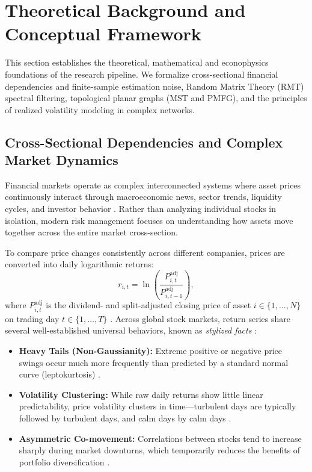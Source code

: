 \section{Theoretical Background and Conceptual Framework}
\label{sec:theoretical_background}

This section establishes the theoretical, mathematical and econophysics foundations of the research pipeline. We formalize cross-sectional financial dependencies and finite-sample estimation noise, Random Matrix Theory (RMT) spectral filtering, topological planar graphs (MST and PMFG), and the principles of realized volatility modeling in complex networks.

\subsection{Cross-Sectional Dependencies and Complex Market Dynamics}
\label{subsec:theory_market_dynamics}

Financial markets operate as complex interconnected systems where asset prices continuously interact through macroeconomic news, sector trends, liquidity cycles, and investor behavior \cite{mantegna_stanley_1999_book,bouchaud_potters_2003}. Rather than analyzing individual stocks in isolation, modern risk management focuses on understanding how assets move together across the entire market cross-section.

To compare price changes consistently across different companies, prices are converted into daily logarithmic returns:
\begin{equation}
r_{i,t} = \ln\left(\frac{P_{i,t}^{\mathrm{adj}}}{P_{i,t-1}^{\mathrm{adj}}}\right),
\label{eq:theory_log_returns}
\end{equation}
where $P_{i,t}^{\mathrm{adj}}$ is the dividend- and split-adjusted closing price of asset $i \in \{1, \dots, N\}$ on trading day $t \in \{1, \dots, T\}$ \cite{campbell_1997_econometrics,tsay_2005_analysis}. Across global stock markets, return series share several well-established universal behaviors, known as \emph{stylized facts} \cite{cont_2001_empirical}:
\begin{itemize}
  \item \textbf{Heavy Tails (Non-Gaussianity):} Extreme positive or negative price swings occur much more frequently than predicted by a standard normal curve (leptokurtosis) \cite{mandelbrot_1963_variation,fama_1965_behavior}.
  \item \textbf{Volatility Clustering:} While raw daily returns show little linear predictability, price volatility clusters in time---turbulent days are typically followed by turbulent days, and calm days by calm days \cite{engle_1982_autoregressive,bollerslev_1986_generalized}.
  \item \textbf{Asymmetric Co-movement:} Correlations between stocks tend to increase sharply during market downturns, which temporarily reduces the benefits of portfolio diversification \cite{longin_solnik_2001_extreme,ang_chen_2002_asymmetric}.
\end{itemize}


